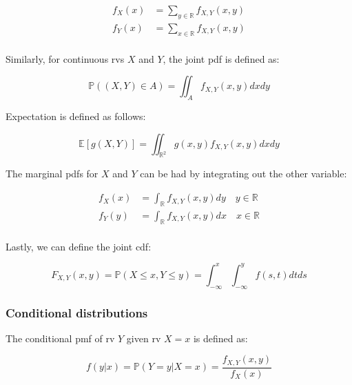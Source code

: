 \documentclass{report}
\begin{document}
\begin{equation}
    \begin{aligned}
        f_X(x) &= \sum_{y \in \mathbb{R}} f_{X, Y}(x,y) \\
        f_Y(x) &= \sum_{x \in \mathbb{R}} f_{X, Y}(x,y) \\
    \end{aligned}
\end{equation}

Similarly, for continuous \glspl{rv} $X$ and $Y$, the joint \gls{pdf} is defined as:

\begin{equation}\label{eq:joint-pdf}
    \mathbb{P}((X,Y) \in A) = \iint_A f_{X, Y}(x,y) dxdy
\end{equation}

Expectation is defined as follows:

\begin{equation}\label{eq:joint-expectation-continuous}
    \mathbb{E}[g(X,Y)] = \iint_{\mathbb{R}^2} g(x,y)f_{X, Y}(x,y) dxdy
\end{equation}

The marginal \glspl{pdf} for $X$ and $Y$ can be had by integrating out the other variable:

\begin{equation}
    \begin{aligned}
        f_X(x) &= \int_{\mathbb{R}} f_{X, Y}(x,y) dy \quad y \in \mathbb{R} \\
        f_Y(y) &= \int_{\mathbb{R}} f_{X, Y}(x,y) dx \quad x \in \mathbb{R} \\
    \end{aligned}
\end{equation}

Lastly, we can define the joint \gls{cdf}:

\begin{equation}\label{eq:joint-cdf}
    F_{X, Y}(x,y) = \mathbb{P}(X \leq x, Y \leq y) = \int_{-\infty}^x \int_{-\infty}^y f(s,t)dtds
\end{equation}

\subsubsection{Conditional distributions}

The conditional \gls{pmf} of \gls{rv} $Y$ given \gls{rv} $X = x$ is defined as:

\begin{equation}\label{eq:conditional-pmf}
    f(y|x) = \mathbb{P}(Y = y | X = x) = \frac{f_{X, Y}(x,y)}{f_X(x)}
\end{equation}
\end{document}
